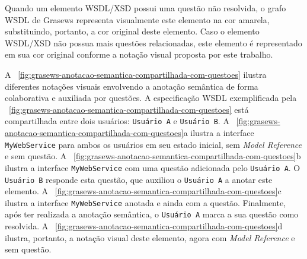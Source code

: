 
Quando um elemento WSDL/XSD possui uma questão não resolvida, o grafo WSDL de Grasews representa visualmente este elemento na cor amarela, substituindo, portanto, a cor original deste elemento. Caso o elemento WSDL/XSD não possua mais questões relacionadas, este elemento é representado em sua cor original conforme a notação visual proposta por este trabalho.

A \figurename~\ref{fig:grasews-anotacao-semantica-compartilhada-com-questoes} ilustra diferentes notações visuais envolvendo a anotação semântica de forma colaborativa e auxiliada por questões. A especificação WSDL exemplificada pela  \figurename~\ref{fig:grasews-anotacao-semantica-compartilhada-com-questoes} está compartilhada entre dois usuários: \texttt{Usuário A} e \texttt{Usuário B}. A \figurename~\ref{fig:grasews-anotacao-semantica-compartilhada-com-questoes}a ilustra a interface \texttt{MyWebService} para ambos os usuários em seu estado inicial, sem \textit{Model Reference} e sem questão. A \figurename~\ref{fig:grasews-anotacao-semantica-compartilhada-com-questoes}b ilustra a interface \texttt{MyWebService} com uma questão adicionada pelo \texttt{Usuário A}. O \texttt{Usuário B} responde esta questão, que auxiliou o \texttt{Usuário A} a anotar este elemento. A \figurename~\ref{fig:grasews-anotacao-semantica-compartilhada-com-questoes}c ilustra a interface \texttt{MyWebService} anotada e ainda com a questão. Finalmente, após ter realizada a anotação semântica, o \texttt{Usuário A} marca a sua questão como resolvida. A \figurename~\ref{fig:grasews-anotacao-semantica-compartilhada-com-questoes}d ilustra, portanto, a notação visual deste elemento, agora com \textit{Model Reference} e sem questão. 

